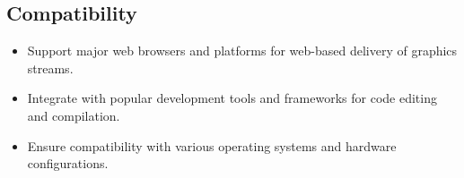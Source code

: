 \subsection{Compatibility}

\begin{itemize}
    \item Support major web browsers and platforms for web-based delivery of graphics streams.
    \item Integrate with popular development tools and frameworks for code editing and compilation.
    \item Ensure compatibility with various operating systems and hardware configurations.
\end{itemize}